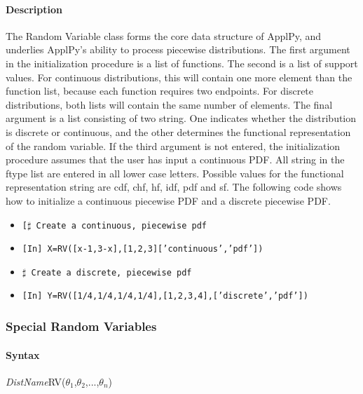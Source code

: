 \documentclass[11pt,epsfig,psfig,doublespace,singlespace]{article}
\begin{document}
\paragraph{Description} The Random Variable class forms the core data structure of ApplPy, and underlies ApplPy's ability to process piecewise distributions. The first argument in the initialization procedure is a list of functions. The second is a list of support values. For continuous distributions, this will contain one more element than the function list, because each function requires two endpoints. For discrete distributions, both lists will contain the same number of elements. The final argument is a list consisting of two string. One indicates whether the distribution is discrete or continuous, and the other determines the functional representation of the random variable. If the third argument is not entered, the initialization procedure assumes that the user has input a continuous PDF. All string in the ftype list are entered in all lower case letters. Possible values for the functional representation string are cdf, chf, hf, idf, pdf and sf. The following code shows how to initialize a continuous piecewise PDF and a discrete piecewise PDF.
\begin{itemize}
\item \texttt{[$\sharp$ Create a continuous, piecewise pdf}
\item \texttt{[In] X=RV([x-1,3-x],[1,2,3]['continuous','pdf'])}
\item \texttt{$\sharp$ Create a discrete, piecewise pdf}
\item \texttt{[In] Y=RV([1/4,1/4,1/4,1/4],[1,2,3,4],['discrete','pdf'])}
\end{itemize} 
\subsubsection{Special Random Variables}
\paragraph{Syntax} \textit{DistName}RV($\theta_1$,$\theta_2$,...,$\theta_n$)
\end{document}
